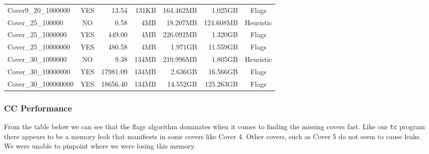 \documentclass[10pt]{article}
\begin{document}
\begin{table}[H]
\begin{tabular}{l|c|r|r|r|r|c}
            Cover9\_20\_1000000  & YES & 13.54    & 131KB & 164.462MB & 1.025GB   & Flags \\
            Cover\_25\_100000    & NO  & 0.58     & 4MB   & 18.207MB  & 124.608MB & Heuristic \\
            Cover\_25\_1000000   & YES & 449.00   & 4MB   & 226.092MB & 1.320GB   & Flags \\
            Cover\_25\_10000000  & YES & 480.58   & 4MB   & 1.971GB   & 11.559GB  & Flags \\
            Cover\_30\_1000000   & NO  & 9.38     & 134MB & 210.996MB & 1.805GB   & Heuristic \\
            Cover\_30\_10000000  & YES & 17981.09 & 134MB & 2.636GB   & 16.566GB  & Flags\\
            Cover\_30\_100000000 & YES & 18656.40 & 134MB & 14.552GB  & 125.263GB & Flags\\
            \bottomrule
        \end{tabular}
    \end{table}

    \subsubsection{CC Performance}

    From the table below we can see that the flags algorithm dominates when it
    comes to finding the missing covers fast. Like our \texttt{tc} program
    there appears to be a memory leak that manifiests in some covers like Cover
    4. Other covers, such as Cover 5 do not seem to cause leaks. We were unable
    to pinpoint where we were losing this memory.
\end{document}
